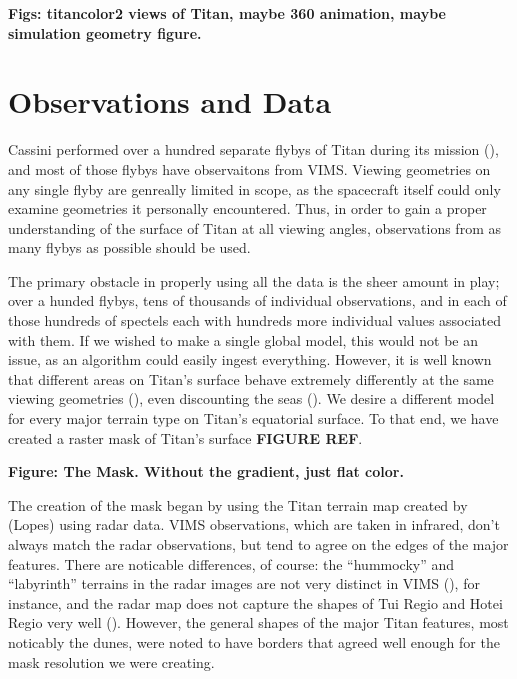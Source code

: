 \documentclass[twocolumn,linenumbers]{aastex631}
\begin{document}
\textbf{\color{blue}Figs: titancolor2 views of Titan, maybe 360 animation, maybe simulation geometry figure.\color{black}}

\section{Observations and Data} \label{sec:observe}

Cassini performed over a hundred separate flybys of Titan during its mission (), and most of those flybys have observaitons from VIMS. Viewing geometries on any single flyby are genreally limited in scope, as the spacecraft itself could only examine geometries it personally encountered. Thus, in order to gain a proper understanding of the surface of Titan at all viewing angles, observations from as many flybys as possible should be used. 

The primary obstacle in properly using all the data is the sheer amount in play; over a hunded flybys, tens of thousands of individual observations, and in each of those hundreds of spectels each with hundreds more individual values associated with them. If we wished to make a single global model, this would not be an issue, as an algorithm could easily ingest everything. However, it is well known that different areas on Titan's surface behave extremely differently at the same viewing geometries (), even discounting the seas (). We desire a different model for every major terrain type on Titan's equatorial surface. To that end, we have created a raster mask of Titan's surface \textbf{\color{blue}FIGURE REF\color{black}}.

\textbf{\color{blue}Figure: The Mask. Without the gradient, just flat color. \color{black}}

The creation of the mask began by using the Titan terrain map created by (Lopes) using radar data. VIMS observations, which are taken in infrared, don't always match the radar observations, but tend to agree on the edges of the major features. There are noticable differences, of course: the ``hummocky'' and ``labyrinth'' terrains in the radar images are not very distinct in VIMS (), for instance, and the radar map does not capture the shapes of Tui Regio and Hotei Regio very well (). However, the  general shapes of the major Titan features, most noticably the dunes, were noted to have borders that agreed well enough for the mask resolution we were creating.
\end{document}
